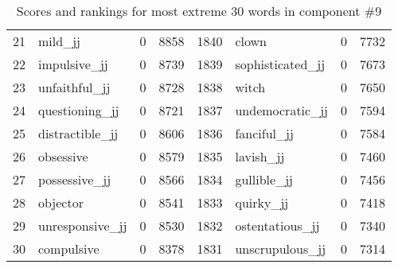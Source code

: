 \begin{table}[tbp]
\begin{tabular}{| rlr@{.}l | rlr@{.}l |}
    21 & mild\_jj & 0 & 8858    &    1840 & clown & 0 & 7732 \\
    22 & impulsive\_jj & 0 & 8739    &    1839 & sophisticated\_jj & 0 & 7673 \\
    23 & unfaithful\_jj & 0 & 8728    &    1838 & witch & 0 & 7650 \\
    24 & questioning\_jj & 0 & 8721    &    1837 & undemocratic\_jj & 0 & 7594 \\
    25 & distractible\_jj & 0 & 8606    &    1836 & fanciful\_jj & 0 & 7584 \\
    26 & obsessive & 0 & 8579    &    1835 & lavish\_jj & 0 & 7460 \\
    27 & possessive\_jj & 0 & 8566    &    1834 & gullible\_jj & 0 & 7456 \\
    28 & objector & 0 & 8541    &    1833 & quirky\_jj & 0 & 7418 \\
    29 & unresponsive\_jj & 0 & 8530    &    1832 & ostentatious\_jj & 0 & 7340 \\
    30 & compulsive & 0 & 8378    &    1831 & unscrupulous\_jj & 0 & 7314 \\
    \hline
    \end{tabular}
    \caption{Scores and rankings for most extreme 30 words in component \#9} 
\end{table}
\clearpage
